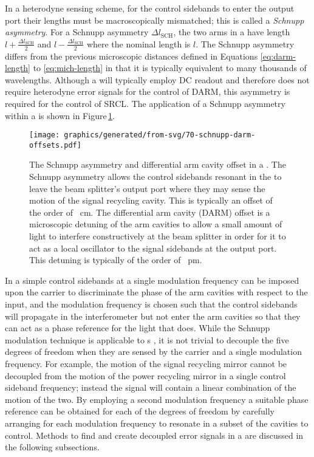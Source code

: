 In a heterodyne sensing scheme, for the control sidebands to enter the output port their lengths must be macroscopically mismatched; this is called a \emph{Schnupp asymmetry}. For a Schnupp asymmetry $\Delta l_{\text{SCH}}$, the two arms in a \MI{} have length $l + \frac{\Delta l_{\text{SCH}}}{2}$ and $l - \frac{\Delta l_{\text{SCH}}}{2}$ where the nominal length is $l$. The Schnupp asymmetry differs from the previous microscopic distances defined in Equations \ref{eq:darm-length} to \ref{eq:mich-length} in that it is typically equivalent to many thousands of wavelengths. Although a \DRFPMI{} will typically employ \gls{DC} readout and therefore does not require heterodyne error signals for the control of \gls{DARM}, this asymmetry is required for the control of \gls{SRCL}. The application of a Schnupp asymmetry within a \DRFPMI{} is shown in Figure\,\ref{fig:schnupp-darm-offsets}.

\begin{figure}
  \centering
  \texttt{[image: graphics/generated/from-svg/70-schnupp-darm-offsets.pdf]}
  \caption[Schnupp asymmetry and differential arm cavity offset in a \DRFPMI{}]{\label{fig:schnupp-darm-offsets}The Schnupp asymmetry and differential arm cavity offset in a \DRFPMI{}. The Schnupp asymmetry allows the control sidebands resonant in the \MI{} to leave the beam splitter's output port where they may sense the motion of the signal recycling cavity. This is typically an offset of the order of \SI{}{\centi\meter}. The differential arm cavity (\gls{DARM}) offset is a microscopic detuning of the arm cavities to allow a small amount of light to interfere constructively at the beam splitter in order for it to act as a local oscillator to the signal sidebands at the output port. This detuning is typically of the order of \SI{}{\pico\meter}.}
\end{figure}

In a simple \MI{} control sidebands at a single modulation frequency can be imposed upon the carrier to discriminate the phase of the arm cavities with respect to the input, and the modulation frequency is chosen such that the control sidebands will propagate in the interferometer but not enter the arm cavities so that they can act as a phase reference for the light that does. While the Schnupp modulation technique is applicable to \DRFPMI{}s \cite{Heinzel1998}, it is not trivial to decouple the five degrees of freedom when they are sensed by the carrier and a single modulation frequency. For example, the motion of the signal recycling mirror cannot be decoupled from the motion of the power recycling mirror in a single control sideband frequency; instead the signal will contain a linear combination of the motion of the two. By employing a second modulation frequency a suitable phase reference can be obtained for each of the degrees of freedom by carefully arranging for each modulation frequency to resonate in a subset of the cavities to control. Methods to find and create decoupled error signals in a \DRFPMI{} are discussed in the following subsections.

